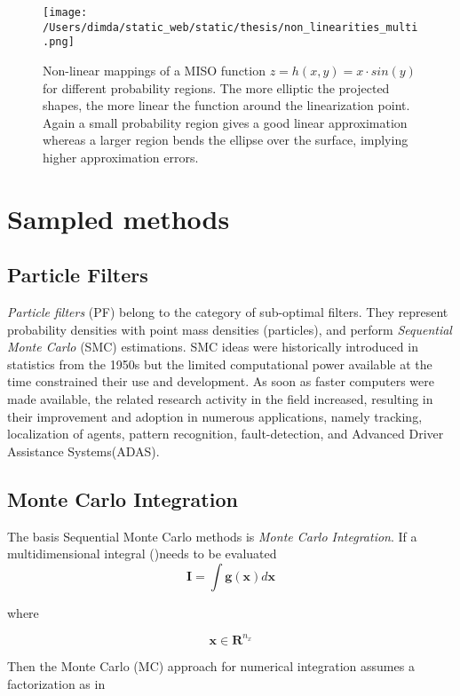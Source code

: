 \begin{figure}[H]
	\centering
	\texttt{[image: /Users/dimda/static\_web/static/thesis/non\_linearities\_multi.png]}
	\caption{Non-linear mappings of a MISO function $z=h(x,y) = x \cdot sin(y)$ for different probability regions. The more elliptic the projected shapes, the more linear the function around the linearization point. Again a small probability region gives a good linear approximation whereas a larger region bends the ellipse over the surface, implying higher approximation errors\cite{Sola2011}.}
	\label{fig:nonlinearitiesmulti}
\end{figure}

\section{Sampled methods}
\subsection{Particle Filters}
\emph{Particle filters} (PF) belong to the category of sub-optimal filters. They represent probability densities with point mass densities (particles), and perform \emph{Sequential Monte Carlo} (SMC) estimations. SMC ideas were historically introduced in statistics from the 1950s but the limited computational power available at the time constrained their use and development. As soon as faster computers were made available, the related research activity in the field increased, resulting in their improvement and adoption in numerous applications, namely tracking, localization of agents, pattern recognition, fault-detection, and Advanced Driver Assistance Systems(ADAS). 

\subsection{Monte Carlo Integration}
The basis Sequential Monte Carlo methods is \emph{Monte Carlo Integration}. If a multidimensional integral ()needs to be evaluated 
\begin{equation}
\label{eq:MCI}
\mathbf{I} = \int \mathbf{g(x)} d\mathbf{x}
\end{equation}

where 

\begin{equation}
	 \mathbf{x} \in \mathbf{R}^{n_{x}} 
\end{equation}


Then the Monte Carlo (MC) approach for numerical integration assumes a factorization as in 

